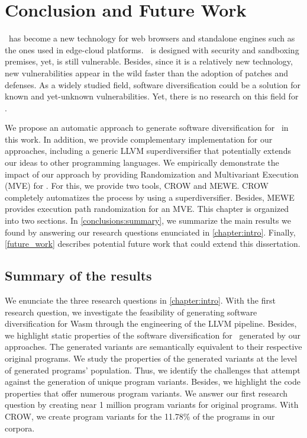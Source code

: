 \chapter{Conclusion and Future Work}
\label{chapter:conclude}

\wasm\ has become a new technology for web browsers and standalone engines such as the ones used in edge-cloud platforms. \wasm\ is designed with security and sandboxing premises, yet, is still vulnerable.
Besides, since it is a relatively new technology, new vulnerabilities appear in the wild faster than the adoption of patches and defenses.
As a widely studied field, software diversification could be a solution for known and yet-unknown vulnerabilities. Yet, there is no research on this field for \wasm.

We propose an automatic approach to generate software diversification for \wasm\ in this work. 
In addition, we provide complementary implementation for our approaches, including a generic LLVM superdiversifier that potentially extends our ideas to other programming languages.
We empirically demonstrate the impact of our approach by providing Randomization and Multivariant Execution (MVE) for \wasm.
For this, we provide two tools, CROW and MEWE. CROW completely automatizes the process by using a superdiversifier. Besides, MEWE provides execution path randomization for an MVE.
This chapter is organized into two sections. 
In \autoref{conclusions:summary}, we summarize the main results we found by answering our research questions enunciated in \autoref{chapter:intro}.
Finally, \autoref{future_work} describes potential future work that could extend this dissertation.

\section{Summary of the results}
\label{conclusions:summary}

We enunciate the three research questions in \autoref{chapter:intro}. 
With the first research question, we investigate the feasibility of generating software diversification for Wasm through the engineering of the LLVM pipeline.
Besides, we highlight static properties of the software diversification for \wasm\ generated by our approaches. 
The generated variants are semantically equivalent to their respective original programs.
We study the properties of the generated variants at the level of generated programs' population.
Thus, we identify the challenges that attempt against the generation of unique program variants.
Besides, we highlight the code properties that offer numerous program variants. 
We answer our first research question by creating near 1 million program variants for  original programs. 
With CROW, we create program variants for the 11.78\% of the programs in our corpora.


